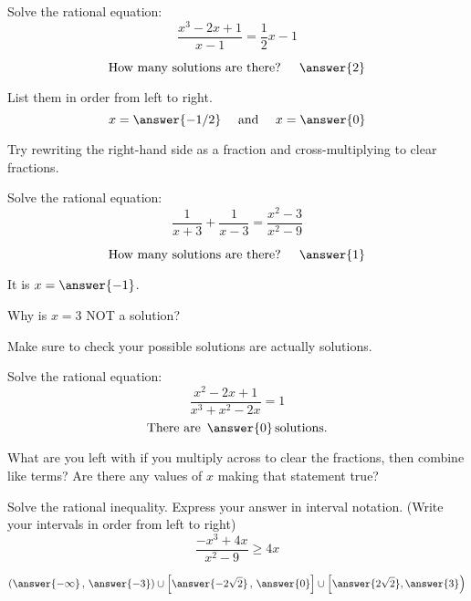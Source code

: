 \documentclass{ximera}
\author{Carl Stitz \and Jeff Zeager \and  Bobby Ramsey}
\begin{document}
\begin{exercise}
	Solve the rational equation:
	\[ \frac{x^3-2x+1}{x-1} = \frac{1}{2} x - 1 \]
	
	\[ \text{How many solutions are there? } \quad \answer{2} \]
	\begin{exercise}
		List them in order from left to right.
		\[ x = \answer{-1/2}  \quad \text{ and } \quad x=\answer{0} \]
	\end{exercise}
\end{exercise}
\begin{hint}
	Try rewriting the right-hand side as a fraction and cross-multiplying to clear fractions.
\end{hint}

\begin{exercise}
	Solve the rational equation:
	\[ \frac{1}{x+3} + \frac{1}{x-3} = \frac{x^2-3}{x^2-9} \]
	
	\[ \text{How many solutions are there? } \quad \answer{1} \]
	\begin{exercise}
		It is $x = \answer{-1}$.
		\begin{exercise}
			Why is $x=3$ NOT a solution?
			\begin{multipleChoice}
			\end{multipleChoice}
		\end{exercise}
	\end{exercise}
\end{exercise}
\begin{hint}
	Make sure to check your possible solutions are actually solutions.
\end{hint}

\begin{exercise}
	Solve the rational equation:
	\[ \frac{x^2-2x+1}{x^3+x^2-2x} = 1 \]
	\[ \text{There are } \, \answer{0} \, \text{solutions.} \]
	\begin{feedback}
		What are you left with if you multiply across to clear the fractions, then combine like terms?  Are there any values of $x$ making that statement true?	
	\end{feedback}		
\end{exercise}

\begin{exercise}
	Solve the rational inequality.  Express your answer in interval notation.  (Write your intervals in order from left to right)
	\[ \frac{-x^3+4x}{x^2-9} \geq 4x  \]
	
	\[ \left( \answer{-\infty} \, , \, \answer{-3} \right) \cup \left[ \answer{-2\sqrt{2}} \, , \, \answer{0} \right] \cup \left[ \answer{2\sqrt{2}} , \answer{3} \right) \]
		
\end{exercise}
\end{document}
